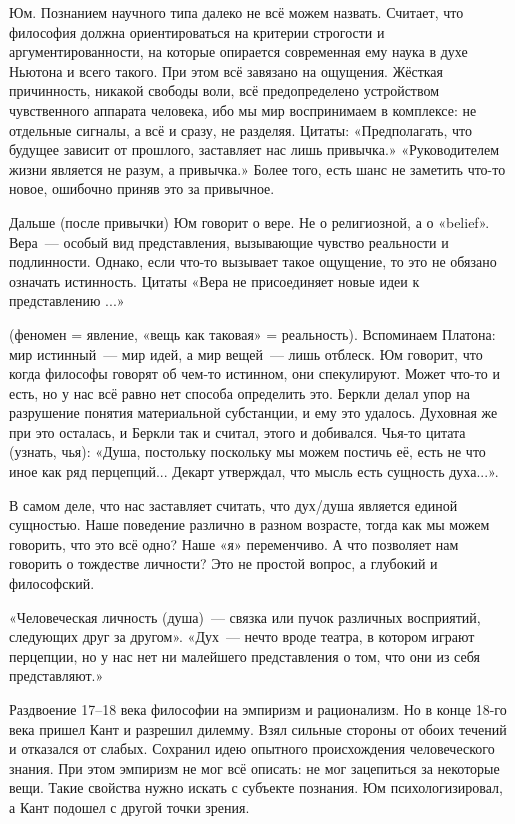Юм. Познанием научного типа далеко не всё можем назвать. 
Считает, что философия должна ориентироваться на критерии строгости и аргументированности, на которые опирается современная ему наука в духе Ньютона и всего такого. 
При этом всё завязано на ощущения. Жёсткая причинность, никакой свободы воли, всё предопределено устройством чувственного аппарата человека, ибо мы мир воспринимаем в комплексе: не отдельные сигналы, а всё и сразу, не разделяя.
Цитаты:
«Предполагать, что будущее зависит от прошлого, заставляет нас лишь привычка.»
«Руководителем жизни является не разум, а привычка.»  
Более того, есть шанс не заметить что-то новое, ошибочно приняв это за привычное.

Дальше (после привычки) Юм говорит о вере. Не о религиозной, а о «belief». Вера~--- особый вид представления, вызывающие чувство реальности и подлинности. 
Однако, если что-то вызывает такое ощущение, то это не обязано означать истинность. Цитаты «Вера не присоединяет новые идеи к представлению ...»

 (феномен = явление, «вещь как таковая» = реальность). Вспоминаем Платона: мир истинный~--- мир идей, а мир вещей~--- лишь отблеск. 
Юм говорит, что когда философы говорят об чем-то истинном, они спекулируют. Может что-то и есть, но у нас всё равно нет способа определить это. 
Беркли делал упор на разрушение понятия материальной субстанции, и ему это удалось. 
Духовная же при это осталась, и Беркли так и считал, этого и добивался.
Чья-то цитата (узнать, чья): «Душа, постольку поскольку мы можем постичь её, есть не что иное как ряд перцепций... Декарт утверждал, что мысль есть сущность духа...».

В самом деле, что нас заставляет считать, что дух/душа является единой сущностью. Наше поведение различно в разном возрасте, тогда как мы можем говорить, что это всё одно? Наше «я» переменчиво. 
А что позволяет нам говорить о тождестве личности? Это не простой вопрос, а глубокий и философский.

«Человеческая личность (душа)~--- связка или пучок различных восприятий, следующих друг за другом». 
«Дух~--- нечто вроде театра, в котором играют перцепции, но у нас нет ни малейшего представления о том, что они из себя представляют.»

Раздвоение 17--18 века философии на эмпиризм и рационализм. Но в конце 18-го века пришел Кант и разрешил дилемму. Взял сильные стороны от обоих течений и отказался от слабых. 
Сохранил идею опытного происхождения человеческого знания. При этом эмпиризм не мог всё описать: не мог зацепиться за некоторые вещи. Такие свойства нужно искать с субъекте познания. 
Юм психологизировал, а Кант подошел с другой точки зрения. 

